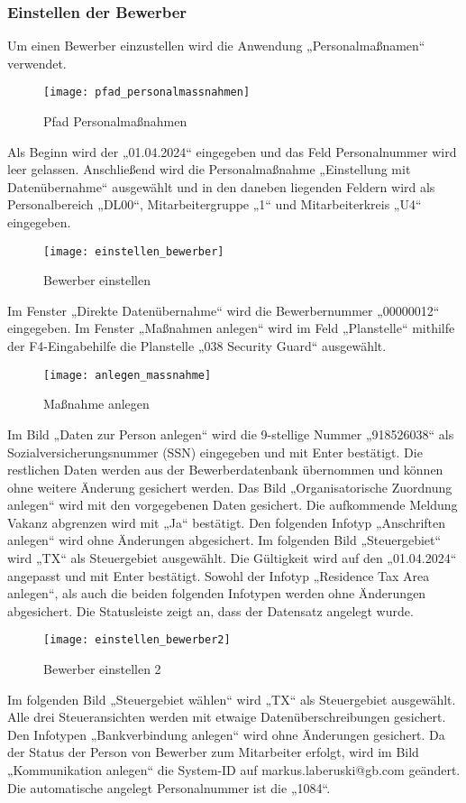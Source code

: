 \subsubsection{Einstellen der Bewerber}
Um einen Bewerber einzustellen wird die Anwendung „Personalmaßnamen“ verwendet.
\begin{figure}[H]
	\centering
	\texttt{[image: pfad\_personalmassnahmen]}
	\caption{Pfad Personalmaßnahmen}
	\label{fig:pfad_personalmassnahmen}
\end{figure}
Als Beginn wird der „01.04.2024“ eingegeben und das Feld Personalnummer wird leer gelassen. Anschließend wird die Personalmaßnahme „Einstellung mit Datenübernahme“ ausgewählt und in den daneben liegenden Feldern wird als Personalbereich „DL00“, Mitarbeitergruppe „1“ und Mitarbeiterkreis „U4“ eingegeben.
\begin{figure}[H]
	\centering
	\texttt{[image: einstellen\_bewerber]}
	\caption{Bewerber einstellen}
	\label{fig:einstellen_bewerber}
\end{figure}
Im Fenster „Direkte Datenübernahme“ wird die Bewerbernummer „00000012“ eingegeben. Im Fenster „Maßnahmen anlegen“ wird im Feld „Planstelle“ mithilfe der F4-Eingabehilfe die Planstelle „038 Security Guard“ ausgewählt.
\begin{figure}[H]
	\centering
	\texttt{[image: anlegen\_massnahme]}
	\caption{Maßnahme anlegen}
	\label{fig:anlegen_massnahme}
\end{figure}
Im Bild „Daten zur Person anlegen“ wird die 9-stellige Nummer „918526038“ als Sozialversicherungsnummer (SSN) eingegeben und mit Enter bestätigt. Die restlichen Daten werden aus der Bewerberdatenbank übernommen und können ohne weitere Änderung gesichert werden. Das Bild „Organisatorische Zuordnung anlegen“ wird mit den vorgegebenen Daten gesichert. Die aufkommende Meldung Vakanz abgrenzen wird mit „Ja“ bestätigt. Den folgenden Infotyp „Anschriften anlegen“ wird ohne Änderungen abgesichert. Im folgenden Bild „Steuergebiet“ wird „TX“ als Steuergebiet ausgewählt. Die Gültigkeit wird auf den „01.04.2024“ angepasst und mit Enter bestätigt. Sowohl der Infotyp „Residence Tax Area anlegen“, als auch die beiden folgenden Infotypen werden ohne Änderungen abgesichert. Die Statusleiste zeigt an, dass der Datensatz angelegt wurde.
\begin{figure}[H]
	\centering
	\texttt{[image: einstellen\_bewerber2]}
	\caption{Bewerber einstellen 2}
	\label{fig:einstellen_bewerber2}
\end{figure}
Im folgenden Bild „Steuergebiet wählen“ wird „TX“ als Steuergebiet ausgewählt. Alle drei Steueransichten werden mit etwaige Datenüberschreibungen gesichert. Den Infotypen „Bankverbindung anlegen“ wird ohne Änderungen gesichert. Da der Status der Person von Bewerber zum Mitarbeiter erfolgt, wird im Bild „Kommunikation anlegen“ die System-ID auf markus.laberuski@gb.com geändert. Die automatische angelegt Personalnummer ist die „1084“.


